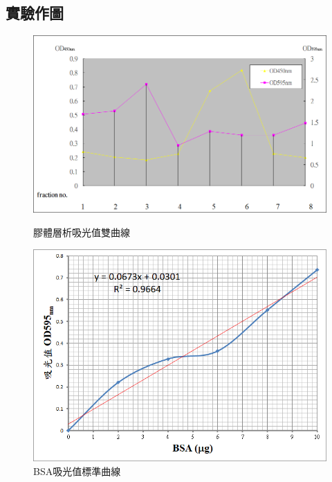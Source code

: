 \subsection*{實驗作圖}

\begin{figure}[H]
\centering
\includegraphics[width=.8\textwidth]{paste_src/2023-10-18-22-15-33.png}
\caption{膠體層析吸光值雙曲線}
\label{fig:gel_filtration}
\vspace{1em}
\includegraphics[width=.8\textwidth]{paste_src/2023-10-18-22-23-08.png}
\caption{BSA吸光值標準曲線}
\label{fig:stand_curve}
\end{figure}




